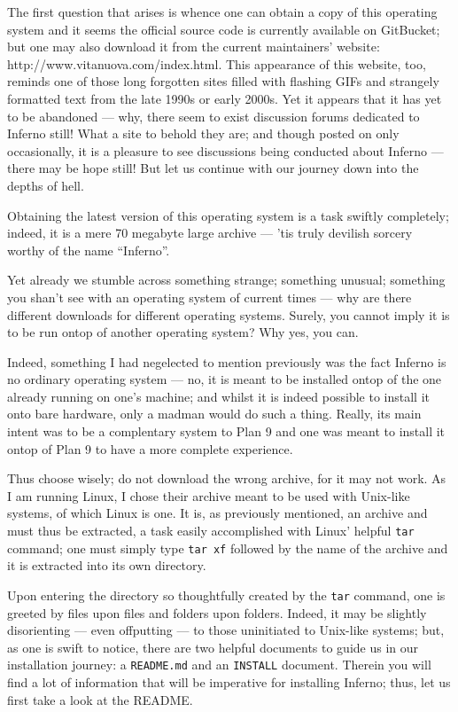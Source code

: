 \documentclass[a5paper,twoside,12pt]{report}
\begin{document}
The first question that arises is whence one can obtain a copy of this operating system and it seems the official source code is currently available on GitBucket; but one may also download it from the current maintainers' website: http://www.vitanuova.com/index.html. This appearance of this website, too, reminds one of those long forgotten sites filled with flashing GIFs and strangely formatted text from the late 1990s or early 2000s. Yet it appears that it has yet to be abandoned — why, there seem to exist discussion forums dedicated to Inferno still! What a site to behold they are; and though posted on only occasionally, it is a pleasure to see discussions being conducted about Inferno — there may be hope still! But let us continue with our journey down into the depths of hell.

Obtaining the latest version of this operating system is a task swiftly completely; indeed, it is a mere 70 megabyte large archive — 'tis truly devilish sorcery worthy of the name  ``Inferno''.

Yet already we stumble across something strange; something unusual; something you shan't see with an operating system of current times — why are there different downloads for different operating systems. Surely, you cannot imply it is to be run ontop of another operating system? Why yes, you can.

Indeed, something I had negelected to mention previously was the fact Inferno is no ordinary operating system — no, it is meant to be installed ontop of the one already running on one's machine; and whilst it is indeed possible to install it onto bare hardware, only a madman would do such a thing. Really, its main intent was to be a complentary system to Plan 9 and one was meant to install it ontop of Plan 9 to have a more complete experience.

Thus choose wisely; do not download the wrong archive, for it may not work. As I am running Linux, I chose their archive meant to be used with Unix-like systems, of which Linux is one. It is, as previously mentioned, an archive and must thus be extracted, a task easily accomplished with Linux' helpful \texttt{tar} command; one must simply type \texttt{tar xf} followed by the name of the archive and it is extracted into its own directory.

Upon entering the directory so thoughtfully created by the \texttt{tar} command, one is greeted by files upon files and folders upon folders. Indeed, it may be slightly disorienting — even offputting — to those uninitiated to Unix-like systems; but, as one is swift to notice, there are two helpful documents to guide us in our installation journey: a \texttt{README.md} and an \texttt{INSTALL} document. Therein you will find a lot of information that will be imperative for installing Inferno; thus, let us first take a look at the README.
\end{document}
